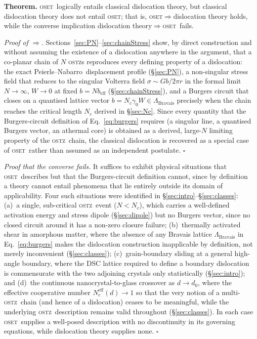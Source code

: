 \documentclass[5p,sort&compress]{elsarticle}
\newcommand{\OSTZ}{\textsc{ostz}}
\newcommand{\OSET}{\textsc{oset}}
\newcommand{\gz}{\gamma_0}
\newcommand{\beff}{b_\mathrm{eff}}
\newcommand{\PN}{Peierls--Nabarro}
\begin{document}
\textbf{Theorem.} \OSET\ logically entails classical dislocation
theory, but classical dislocation theory does not entail \OSET; that
is, \OSET$\Rightarrow$dislocation theory holds, while the converse
implication dislocation theory$\Rightarrow$\OSET\ fails.

\textit{Proof of $\Rightarrow$.} Sections~\ref{sec:PN}--\ref{sec:chainStress}
show, by direct construction and without assuming the existence of a
dislocation anywhere in the argument, that a co-planar chain of $N$
\OSTZ s reproduces every defining property of a dislocation: the
exact \PN\ displacement profile (\S\ref{sec:PN}), a non-singular
stress field that reduces to the singular Volterra field
$\sigma\sim Gb/2\pi r$ in the formal limit $N\to\infty$, $W\to0$ at
fixed $b=N\beff$ (\S\ref{sec:chainStress}), and a Burgers circuit
that closes on a quantised lattice vector $b=N_c\gz W\in
\Lambda_\mathrm{Bravais}$ precisely when the chain reaches the
critical length $N_c$ derived in \S\ref{sec:Nc}. Since every
quantity that the Burgers-circuit definition of
Eq.~\eqref{eq:burgers} requires (a singular line, a quantised
Burgers vector, an athermal core) is obtained as a derived,
large-$N$ limiting property of the \OSTZ\ chain, the classical
dislocation is recovered as a special case of \OSET\ rather than
assumed as an independent postulate. $\square$

\textit{Proof that the converse fails.} It suffices to exhibit
physical situations that \OSET\ describes but that the
Burgers-circuit definition cannot, since by definition a theory
cannot entail phenomena that lie entirely outside its domain of
applicability. Four such situations were identified in
\S\ref{sec:intro}--\S\ref{sec:classes}: (a)~a single, sub-critical
\OSTZ\ event ($N<N_c$), which carries a well-defined activation
energy and stress dipole (\S\ref{sec:dipole}) but no Burgers vector,
since no closed circuit around it has a non-zero closure failure;
(b)~thermally activated shear in amorphous matter, where the
absence of any Bravais lattice $\Lambda_\mathrm{Bravais}$ in
Eq.~\eqref{eq:burgers} makes the dislocation construction
inapplicable by definition, not merely inconvenient
(\S\ref{sec:classes}); (c)~grain-boundary sliding at a general
high-angle boundary, where the DSC lattice required to define a
boundary dislocation is commensurate with the two adjoining crystals
only statistically (\S\ref{sec:intro}); and (d)~the continuous
nanocrystal-to-glass crossover as $d\to d_0$, where the effective
cooperative number $N_c^\text{eff}(d)\to1$ so that the very notion of
a multi-\OSTZ\ chain (and hence of a dislocation) ceases to be
meaningful, while the underlying \OSTZ\ description remains valid
throughout (\S\ref{sec:classes}). In each case \OSET\ supplies a
well-posed description with no discontinuity in its governing
equations, while dislocation theory supplies none. $\square$
\end{document}
